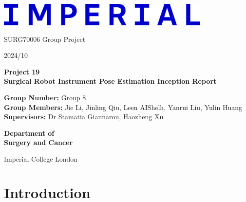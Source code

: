 \documentclass[12pt]{article}
\begin{document}
\begin{titlepage}
      \centering

      \includegraphics[width=0.8\textwidth]{Imperial_College_London_new_logo.png} %
      \vspace*{1cm}

      \Large
      SURG70006 Group Project

      \large
      2024/10

      \vspace{0.5cm}
      \Huge
      \textbf{Project 19 \\ Surgical Robot Instrument Pose Estimation Inception Report}

      \vspace{1.3cm}


      \begin{mdframed}
            \normalsize %
            \textbf{Group Number:} Group 8\\[20pt] %
            \textbf{Group Members:} Jie Li, Jinling Qiu, Leen AIShelh, Yanrui Liu, Yulin Huang\\[20pt] %
            \textbf{Supervisors:} Dr Stamatia Giannarou, Haozheng Xu %
      \end{mdframed}

      \vspace{2cm} %
      \Large
      \textbf{Department of}\\
      \vspace{0.1cm} %
      \textbf{Surgery and Cancer}

      \vspace{3.6cm} %
      \Large
      Imperial College London\\
      


\end{titlepage}

\newpage
\tableofcontents

\newpage

\section{Introduction} 
\end{document}

